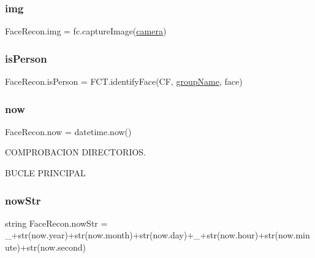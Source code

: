 \subsubsection{\texorpdfstring{img}{img}}
{\footnotesize\ttfamily Face\+Recon.\+img = fc.\+capture\+Image(\mbox{\hyperlink{namespace_face_recon_ac6ec5c173cf48f7c65fc970e1e079ca9}{camera}})}

\mbox{\label{namespace_face_recon_ad661554f5aa9213b00b4d791a65a29eb}} 
\subsubsection{\texorpdfstring{is\+Person}{isPerson}}
{\footnotesize\ttfamily Face\+Recon.\+is\+Person = F\+C\+T.\+identify\+Face(CF, \mbox{\hyperlink{namespace_face_recon_ae44f8e751a650fcfa6bc7d2a61242cc1}{group\+Name}}, face)}

\mbox{\label{namespace_face_recon_ac1dfb5855321e10d5338ad161bfa8151}} 
\subsubsection{\texorpdfstring{now}{now}}
{\footnotesize\ttfamily Face\+Recon.\+now = datetime.\+now()}



C\+O\+M\+P\+R\+O\+B\+A\+C\+I\+ON D\+I\+R\+E\+C\+T\+O\+R\+I\+OS. 

B\+U\+C\+LE P\+R\+I\+N\+C\+I\+P\+AL \mbox{\label{namespace_face_recon_af54252e1ad4d24d516c64eaaa88905ce}} 
\subsubsection{\texorpdfstring{now\+Str}{nowStr}}
{\footnotesize\ttfamily string Face\+Recon.\+now\+Str = \textquotesingle{}\+\_\+\textquotesingle{}+str(now.\+year)+str(now.\+month)+str(now.\+day)+\textquotesingle{}\+\_\+\textquotesingle{}+str(now.\+hour)+str(now.\+minute)+str(now.\+second)}

\mbox{\label{namespace_face_recon_ac4b8075620307b113830af1893363bbe}} 

